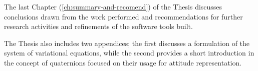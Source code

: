 The last Chapter (\autoref{ch:summary-and-recomend}) of the Thesis discusses
conclusions drawn from the work performed and recommendations for further research
activities and refinements of the software tools built.

The Thesis also includes two appendices; the first discusses 
a formulation of the system of variational equations, while the second provides a short 
introduction in the concept of quaternions focused on their usage for attitude 
representation.
